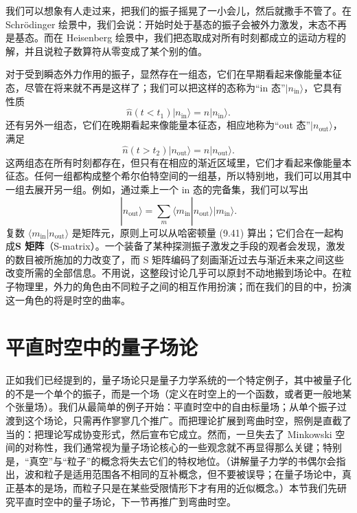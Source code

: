 我们可以想象有人走过来，把我们的振子摇晃了一小会儿，然后就撒手不管了。在 Schrödinger 绘景中，我们会说：开始时处于基态的振子会被外力激发，末态不再是基态。而在 Heisenberg 绘景中，我们把态取成对所有时刻都成立的运动方程的解，并且说粒子数算符从零变成了某个别的值。

对于受到瞬态外力作用的振子，显然存在一组态，它们在早期看起来像能量本征态，尽管在将来就不再是这样了；我们可以把这样的态称为“in 态”$|n_{\mathrm{in}}\rangle$，它具有性质
\begin{equation*}
\hat{n}(t < t_1)|n_{\mathrm{in}}\rangle = n|n_{\mathrm{in}}\rangle.
\tag{9.43}
\end{equation*}
还有另外一组态，它们在晚期看起来像能量本征态，相应地称为“out 态”$|n_{\mathrm{out}}\rangle$，满足
\begin{equation*}
\hat{n}(t > t_2)|n_{\mathrm{out}}\rangle = n|n_{\mathrm{out}}\rangle.
\tag{9.44}
\end{equation*}
这两组态在所有时刻都存在，但只有在相应的渐近区域里，它们才看起来像能量本征态。任何一组都构成整个希尔伯特空间的一组基，所以特别地，我们可以用其中一组去展开另一组。例如，通过乘上一个 in 态的完备集，我们可以写出
\begin{equation*}
|n_{\mathrm{out}}\rangle = \sum_m \langle m_{\mathrm{in}}|n_{\mathrm{out}}\rangle|m_{\mathrm{in}}\rangle.
\tag{9.45}
\end{equation*}
复数 $\langle m_{\mathrm{in}}|n_{\mathrm{out}}\rangle$ 是矩阵元，原则上可以从哈密顿量 (9.41) 算出；它们合在一起构成\textbf{S 矩阵}（S-matrix）。一个装备了某种探测振子激发之手段的观者会发现，激发的数目被所施加的力改变了，而 S 矩阵编码了刻画渐近过去与渐近未来之间这些改变所需的全部信息。不用说，这整段讨论几乎可以原封不动地搬到场论中。在粒子物理里，外力的角色由不同粒子之间的相互作用扮演；而在我们的目的中，扮演这一角色的将是时空的曲率。

\section{平直时空中的量子场论}

正如我们已经提到的，量子场论只是量子力学系统的一个特定例子，其中被量子化的不是一个单个的振子，而是一个场（定义在时空上的一个函数，或者更一般地某个张量场）。我们从最简单的例子开始：平直时空中的自由标量场；从单个振子过渡到这个场论，只需再作寥寥几个推广。而把理论扩展到弯曲时空，照例是直截了当的：把理论写成协变形式，然后宣布它成立。然而，一旦失去了 Minkowski 空间的对称性，我们通常视为量子场论核心的一些观念就不再显得那么关键；特别是，“真空”与“粒子”的概念将失去它们的特权地位。（讲解量子力学的书偶尔会指出，波和粒子是适用范围各不相同的互补概念，但不要被误导；在量子场论中，真正基本的是场，而粒子只是在某些受限情形下才有用的近似概念。）本节我们先研究平直时空中的量子场论，下一节再推广到弯曲时空。

